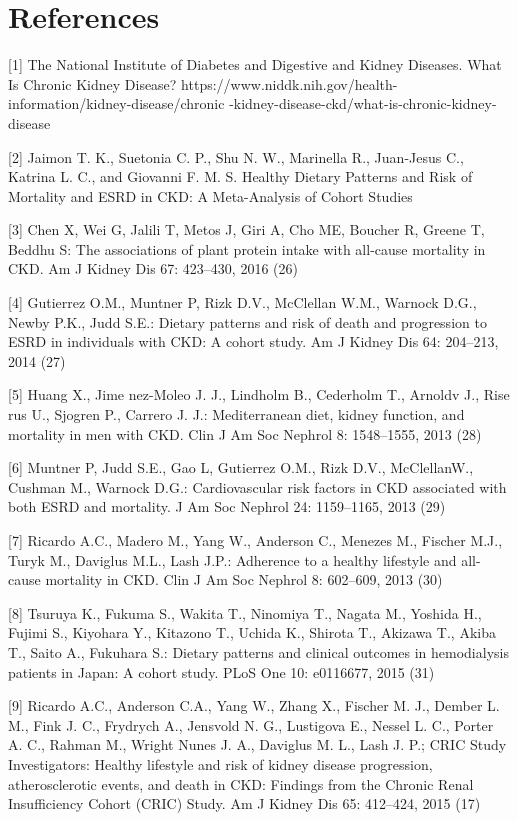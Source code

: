 \section{References}
\begin{flushleft}

[1]	The National Institute of Diabetes and Digestive and Kidney Diseases. What Is Chronic 
Kidney Disease? https://www.niddk.nih.gov/health-information/kidney-disease/chronic 
-kidney-disease-ckd/what-is-chronic-kidney-disease

[2]	Jaimon T. K., Suetonia C. P., Shu N. W., Marinella R., Juan-Jesus C., Katrina L. C., and Giovanni F. M. S.  Healthy Dietary Patterns and Risk of Mortality and ESRD in CKD: A Meta-Analysis of Cohort Studies 

[3]	Chen X, Wei G, Jalili T, Metos J, Giri A, Cho ME, Boucher R, Greene T, Beddhu S: The associations of plant protein intake with all-cause mortality in CKD. Am J Kidney Dis 67: 423–430, 2016 (26)

[4]	Gutierrez O.M., Muntner P, Rizk D.V., McClellan W.M., Warnock D.G., Newby P.K., Judd S.E.: Dietary patterns and risk of death and progression to ESRD in individuals with CKD: A cohort study. Am J Kidney Dis 64: 204–213, 2014  (27)

[5]	Huang X., Jime nez-Moleo J. J., Lindholm B., Cederholm T., Arnoldv J., Rise rus U., Sjogren P., Carrero J. J.: Mediterranean diet, kidney function, and mortality in men with CKD. Clin J Am Soc Nephrol 8: 1548–1555, 2013 (28)

[6]	Muntner P, Judd S.E., Gao L, Gutierrez O.M., Rizk D.V., McClellanW., Cushman M., Warnock D.G.: Cardiovascular risk factors in CKD associated with both ESRD and mortality. J Am Soc Nephrol 24: 1159–1165, 2013 (29)

[7]	Ricardo A.C., Madero M., Yang W., Anderson C., Menezes M., Fischer M.J., Turyk M., Daviglus M.L., Lash J.P.: Adherence to a healthy lifestyle and all-cause mortality in CKD. Clin J Am Soc Nephrol 8: 602–609, 2013 (30)

[8]	Tsuruya K., Fukuma S., Wakita T., Ninomiya T., Nagata M., Yoshida H., Fujimi S., Kiyohara Y., Kitazono T., Uchida K., Shirota T., Akizawa T., Akiba T., Saito A., Fukuhara S.: Dietary patterns and clinical outcomes in hemodialysis patients in Japan: A cohort study. PLoS One 10: e0116677, 2015 (31)

[9]	Ricardo A.C., Anderson C.A., Yang W., Zhang X., Fischer M. J., Dember L. M., Fink J. C., Frydrych A., Jensvold N. G., Lustigova E., Nessel L. C., Porter A. C., Rahman M., Wright Nunes J. A., Daviglus M. L., Lash J. P.; CRIC Study Investigators: Healthy lifestyle and risk of kidney disease progression, atherosclerotic events, and death in CKD: Findings from the Chronic Renal Insufficiency Cohort (CRIC) Study. Am J Kidney Dis 65: 412–424, 2015 (17)


\end{flushleft}
